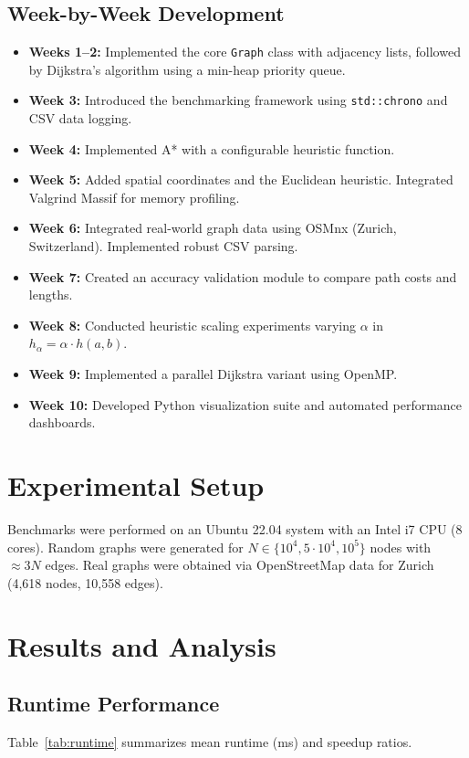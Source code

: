 \documentclass[conference]{IEEEtran}
\begin{document}
\subsection{Week-by-Week Development}
\begin{itemize}
  \item \textbf{Weeks 1--2:} Implemented the core \texttt{Graph} class with adjacency lists, followed by Dijkstra’s algorithm using a min-heap priority queue.
  \item \textbf{Week 3:} Introduced the benchmarking framework using \texttt{std::chrono} and CSV data logging.
  \item \textbf{Week 4:} Implemented A* with a configurable heuristic function.
  \item \textbf{Week 5:} Added spatial coordinates and the Euclidean heuristic. Integrated Valgrind Massif for memory profiling.
  \item \textbf{Week 6:} Integrated real-world graph data using OSMnx (Zurich, Switzerland). Implemented robust CSV parsing.
  \item \textbf{Week 7:} Created an accuracy validation module to compare path costs and lengths.
  \item \textbf{Week 8:} Conducted heuristic scaling experiments varying $\alpha$ in $h_\alpha = \alpha \cdot h(a,b)$.
  \item \textbf{Week 9:} Implemented a parallel Dijkstra variant using OpenMP.
  \item \textbf{Week 10:} Developed Python visualization suite and automated performance dashboards.
\end{itemize}

\section{Experimental Setup}
Benchmarks were performed on an Ubuntu 22.04 system with an Intel i7 CPU (8 cores).  
Random graphs were generated for $N \in \{10^4, 5\cdot10^4, 10^5\}$ nodes with $\approx 3N$ edges.  
Real graphs were obtained via OpenStreetMap data for Zurich (4,618 nodes, 10,558 edges).

\section{Results and Analysis}
\subsection{Runtime Performance}
Table~\ref{tab:runtime} summarizes mean runtime (ms) and speedup ratios.
\end{document}
